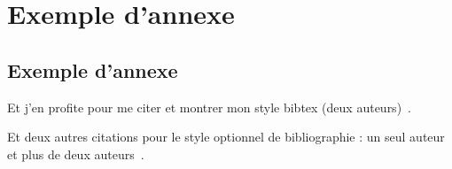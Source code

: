

\chapter{Exemple d'annexe}
\label{chap:annexe1}

\section{Exemple d'annexe}

Et j'en profite pour me citer et montrer mon style bibtex (deux auteurs)~\cite{Commowick_MICCAI_2007}.

Et deux autres citations pour le style optionnel de bibliographie : un seul auteur~\cite{Oakes_RStat_1999} et plus de deux auteurs~\cite{Guimond_CVIU_2000}.